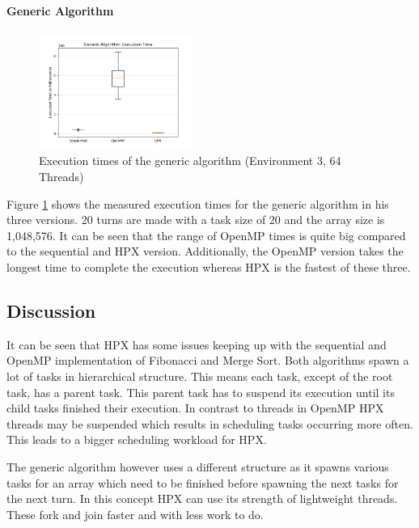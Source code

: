 \paragraph{Generic Algorithm}
  \begin{figure}[htbp]
	\centering
	\includegraphics[width=0.45\textwidth]{figures/generic_NoOp.png}
	\caption{Execution times of the generic algorithm (Environment 3, 64 Threads)}
	\label{fig:gen_NoOp}
\end{figure}
Figure \ref{fig:gen_NoOp} shows the measured execution times for the generic algorithm in his three versions.
20 turns are made with a task size of 20 and the array size is 1,048,576.
It can be seen that the range of OpenMP times is quite big compared to the sequential and HPX version.
Additionally, the OpenMP version takes the longest time to complete the execution whereas HPX is the fastest of these three. 

\subsection{Discussion}
It can be seen that HPX has some issues keeping up with the sequential and OpenMP implementation of Fibonacci and Merge Sort.
Both algorithms spawn a lot of tasks in hierarchical structure.
This means each task, except of the root task, has a parent task.
This parent task has to suspend its execution until its child tasks finished their execution.
In contrast to threads in OpenMP HPX threads may be suspended which results in scheduling tasks occurring more often.
This leads to a bigger scheduling workload for HPX.

The generic algorithm however uses a different structure as it spawns various tasks for an array which need to be finished before spawning the next tasks for the next turn.
In this concept HPX can use its strength of lightweight threads.
These fork and join faster and with less work to do.

